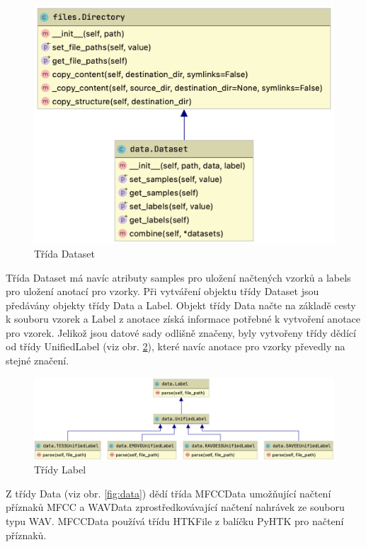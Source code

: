\documentclass[FM,BP]{tulthesis}
\begin{document}
\begin{figure}[h!]
\centerline{\includegraphics[scale=.25,keepaspectratio]{data-dataset.png}}
\caption{Třída Dataset}
\label{fig:datasets}
\end{figure}
\FloatBarrier

Třída \mbox{Dataset} má navíc atributy samples pro uložení načtených vzorků a labels pro uložení anotací pro vzorky. Při vytváření objektu třídy Dataset jsou předávány objekty třídy Data a Label. Objekt třídy Data načte na základě cesty k souboru vzorek a Label z anotace získá informace potřebné k vytvoření anotace pro vzorek. Jelikož jsou datové sady odlišně značeny, byly vytvořeny třídy dědící od třídy \mbox{UnifiedLabel} (viz obr. \mbox{\ref{fig:label}}), které navíc anotace pro vzorky převedly na stejné značení.

\begin{figure}[ht]
\centerline{\includegraphics[scale=.25,keepaspectratio]{data-label.png}}
\caption{Třídy Label}
\label{fig:label}
\end{figure}
\FloatBarrier

Z třídy Data (viz obr. \mbox{\ref{fig:data}}) dědí třída MFCCData umožňující načtení příznaků MFCC a WAVData zprostředkovávající načtení nahrávek ze souboru typu WAV. MFCCData používá třídu HTKFile z balíčku PyHTK pro načtení příznaků.
\end{document}
